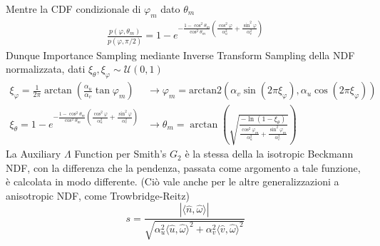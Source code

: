 Mentre la CDF condizionale di $\varphi_m$ dato $\theta_m$
\begin{align}
	\frac{p(\varphi,\theta_m)}{p(\varphi,\pi/2)}=1-e^{-\frac{1-\cos^2\theta_m}{\cos^2\theta_m}\left(\frac{\cos^2\varphi}{\alpha_u^2}%
		+\frac{\sin^2\varphi}{\alpha_v^2}\right)}
\end{align}
Dunque Importance Sampling mediante Inverse Transform Sampling della NDF normalizzata, dati $\xi_\theta,\xi_\varphi\sim\mathcal{U}(0,1)$
\begin{align}\label{chapter3:surface:wardInverseTransformSampling}
	\xi_\varphi=\frac{1}{2\pi}\arctan(\frac{\alpha_u}{\alpha_v}\tan\varphi_m)&\longrightarrow%
		\varphi_m=\mathrm{arctan2}(\alpha_v\sin(2\pi\xi_\varphi),\alpha_u\cos(2\pi\xi_\varphi)) \\
	\xi_\theta=1-e^{-\frac{1-\cos^2\theta_m}{\cos^2\theta_m}\left(\frac{\cos^2\varphi}{\alpha_u^2}%
		+\frac{\sin^2\varphi}{\alpha_v^2}\right)}&\longrightarrow\theta_m=\arctan\left(\sqrt{\frac{-\ln(1-\xi_\theta)}%
			{\frac{\cos^2\varphi_m}{\alpha_u^2}+\frac{\sin^2\varphi_m}{\alpha_v^2}}}\right)
\end{align}
La Auxiliary $\Lambda$ Function per Smith's $G_2$ \`e la stessa della la isotropic Beckmann NDF, con la differenza che la pendenza, passata 
come argomento a tale funzione, \`e calcolata in modo differente. (Ci\`o vale anche per le altre generalizzazioni a anisotropic NDF, come 
Trowbridge-Reitz)
\begin{equation}
	s=\frac{|\langle\hat{n},\hat{\omega}\rangle|}{\sqrt{\alpha_u^2\langle\hat{u},\hat{\omega}\rangle^2+\alpha_v^2\langle\hat{v},\hat{\omega}\rangle^2}}
\end{equation}
